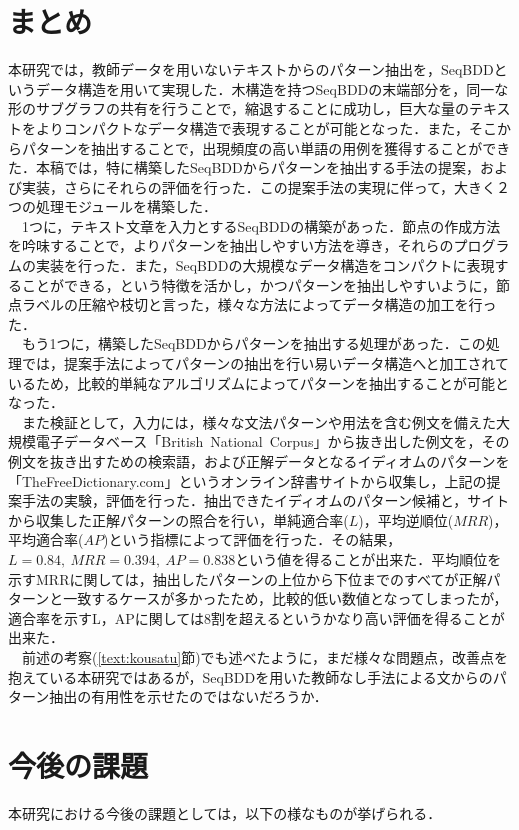 \documentclass[12pt,twoside, fleqn]{ujbook}
\begin{document}
\section{まとめ}
本研究では，教師データを用いないテキストからのパターン抽出を，SeqBDDというデータ構造を用いて実現した．木構造を持つSeqBDDの末端部分を，同一な形のサブグラフの共有を行うことで，縮退することに成功し，巨大な量のテキストをよりコンパクトなデータ構造で表現することが可能となった．また，そこからパターンを抽出することで，出現頻度の高い単語の用例を獲得することができた．本稿では，特に構築したSeqBDDからパターンを抽出する手法の提案，および実装，さらにそれらの評価を行った．この提案手法の実現に伴って，大きく２つの処理モジュールを構築した．\\
　1つに，テキスト文章を入力とするSeqBDDの構築があった．節点の作成方法を吟味することで，よりパターンを抽出しやすい方法を導き，それらのプログラムの実装を行った．また，SeqBDDの大規模なデータ構造をコンパクトに表現することができる，という特徴を活かし，かつパターンを抽出しやすいように，節点ラベルの圧縮や枝切と言った，様々な方法によってデータ構造の加工を行った．\\
　もう1つに，構築したSeqBDDからパターンを抽出する処理があった．この処理では，提案手法によってパターンの抽出を行い易いデータ構造へと加工されているため，比較的単純なアルゴリズムによってパターンを抽出することが可能となった．\\
　また検証として，入力には，様々な文法パターンや用法を含む例文を備えた大規模電子データベース「British\ National\ Corpus」から抜き出した例文を，その例文を抜き出すための検索語，および正解データとなるイディオムのパターンを「TheFreeDictionary.com」というオンライン辞書サイトから収集し，上記の提案手法の実験，評価を行った．抽出できたイディオムのパターン候補と，サイトから収集した正解パターンの照合を行い，単純適合率($L$)，平均逆順位($MRR$)，平均適合率($AP$)という指標によって評価を行った．その結果，$L=0.84,\ MRR=0.394,\ AP=0.838$という値を得ることが出来た．平均順位を示すMRRに関しては，抽出したパターンの上位から下位までのすべてが正解パターンと一致するケースが多かったため，比較的低い数値となってしまったが，適合率を示すL，APに関しては8割を超えるというかなり高い評価を得ることが出来た．\\
　前述の考察(\ref{text:kousatu}節)でも述べたように，まだ様々な問題点，改善点を抱えている本研究ではあるが，SeqBDDを用いた教師なし手法による文からのパターン抽出の有用性を示せたのではないだろうか．

\section{今後の課題}
本研究における今後の課題としては，以下の様なものが挙げられる．
\end{document}
